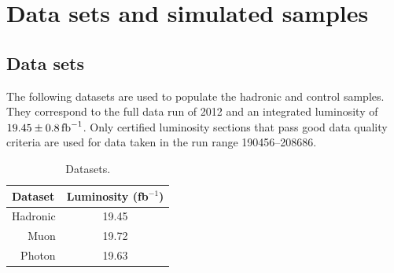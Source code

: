 \clearpage
\section{Data sets and simulated samples\label{sec:samples}}

\subsection{Data sets\label{sec:datasets}}

The following datasets are used to populate the hadronic and
control samples. They correspond to the full data run of 2012 and an
integrated luminosity of $19.45 \pm 0.8\mbox{\ensuremath{\,\text{fb}^\text{$-$1}}}$. Only certified luminosity
sections that pass good data quality criteria are used for data taken in  
the run range 190456--208686.

\begin{table}[h]
  \caption{Datasets.}
  \label{tab:datasets}
  \centering
  \scriptsize
  \begin{tabular}{ lc }
    \hline
    \hline
    Dataset & Luminosity (fb$^{-1}$) \\
    \hline
    \multicolumn{1}{r}{Hadronic} & 19.45 \\ [0.5ex]
    \multicolumn{1}{r}{Muon} & 19.72 \\ [0.5ex] %
    \multicolumn{1}{r}{Photon} & 19.63 \\ [0.5ex] %
    \hline
    \hline
  \end{tabular}
\end{table}


